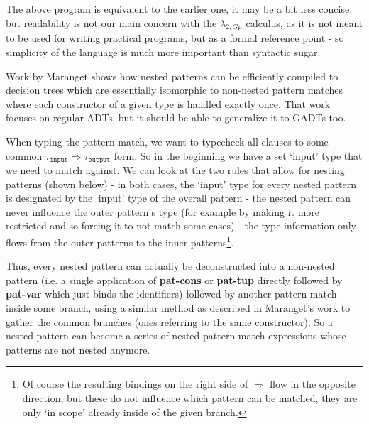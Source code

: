 The above program is equivalent to the earlier one, it may be a bit less concise, but readability is not our main concern with the $\lambda_{2,G\mu}$ calculus, as it is not meant to be used for writing practical programs, but as a formal reference point - so simplicity of the language is much more important than syntactic sugar.

Work by Maranget \cite{DecisionTrees} shows how nested patterns can be efficiently compiled to decision trees which are essentially isomorphic to non-nested pattern matches where each constructor of a given type is handled exactly once. That work focuses on regular ADTs, but it should be able to generalize it to GADTs too.

When typing the pattern match, we want to typecheck all clauses to some common $\tau_{\texttt{input}} \Rightarrow \tau_{\texttt{output}}$ form. So in the beginning we have a set `input' type that we need to match against. We can look at the two rules that allow for nesting patterns (shown below) - in both cases, the `input' type for every nested pattern is designated by the `input' type of the overall pattern - the nested pattern can never influence the outer pattern's type (for example by making it more restricted and so forcing it to not match some cases) - the type information only flows from the outer patterns to the inner patterns\footnote{Of course the resulting bindings on the right side of $\Rightarrow$ flow in the opposite direction, but these do not influence which pattern can be matched, they are only `in scope' already inside of the given branch.}.
\begin{prooftree}
\end{prooftree}
\begin{prooftree}
\end{prooftree}
Thus, every nested pattern can actually be deconstructed into a non-nested pattern (i.e. a single application of \textbf{pat-cons} or \textbf{pat-tup} directly followed by \textbf{pat-var} which just binds the identifiers) followed by another pattern match inside some branch, using a similar method as described in Maranget's work to gather the common branches (ones referring to the same constructor). So a nested pattern can become a series of nested pattern match expressions whose patterns are not nested anymore.

